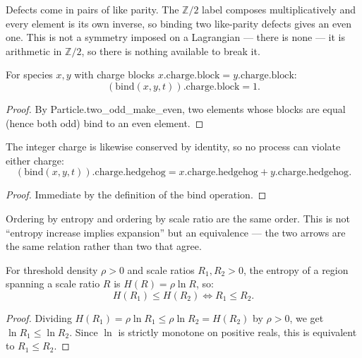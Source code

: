 \begin{theorem}
Defects come in pairs of like parity.  The $\mathbb{Z}/2$ label composes multiplicatively and every element is its own inverse, so binding two like-parity defects gives an even one.  This is not a symmetry imposed on a Lagrangian — there is none — it is arithmetic in $\mathbb{Z}/2$, so there is nothing available to break it.

For species $x, y$ with charge blocks $x.\text{charge.block} = y.\text{charge.block}$:
\begin{equation}
(\text{bind}(x, y, t)).\text{charge.block} = 1.
\end{equation}
\begin{proof}
By Particle.two\_odd\_make\_even, two elements whose blocks are equal (hence both odd) bind to an even element.
\end{proof}
\end{theorem}

\begin{theorem}
The integer charge is likewise conserved by identity, so no process can violate either charge:
\begin{equation}
(\text{bind}(x, y, t)).\text{charge.hedgehog} = x.\text{charge.hedgehog} + y.\text{charge.hedgehog}.
\end{equation}
\begin{proof}
Immediate by the definition of the bind operation.
\end{proof}
\end{theorem}

\begin{theorem}
Ordering by entropy and ordering by scale ratio are the same order.  This is not ``entropy increase implies expansion'' but an equivalence — the two arrows are the same relation rather than two that agree.

For threshold density $\rho > 0$ and scale ratios $R_1, R_2 > 0$, the entropy of a region spanning a scale ratio $R$ is $H(R) = \rho \ln R$, so:
\begin{equation}
H(R_1) \le H(R_2) \iff R_1 \le R_2.
\end{equation}
\begin{proof}
Dividing $H(R_1) = \rho \ln R_1 \le \rho \ln R_2 = H(R_2)$ by $\rho > 0$, we get $\ln R_1 \le \ln R_2$. Since $\ln$ is strictly monotone on positive reals, this is equivalent to $R_1 \le R_2$.
\end{proof}
\end{theorem}

